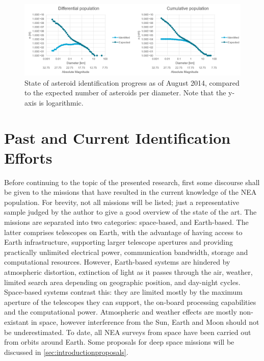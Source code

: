\begin{figure}[htbp]
 \centering
 \includegraphics[width=1.0\textwidth]{img/population_estimates.png}
 \caption{State of asteroid identification progress as of August 2014, compared to the expected number of asteroids per diameter. Note that the y-axis is logarithmic. \cite{HarrisPopulation}}
 \label{fig:population_estimates}
\end{figure}


\section{Past and Current Identification Efforts}
\label{sec:introductionidentification}

Before continuing to the topic of the presented research, first some discourse shall be given to the missions that have resulted in the current knowledge of the NEA population. For brevity, not all missions will be listed; just a representative sample judged by the author to give a good overview of the state of the art. The missions are separated into two categories: space-based, and Earth-based. The latter comprises telescopes on Earth, with the advantage of having access to Earth infrastructure, supporting larger telescope apertures and providing practically unlimited electrical power, communication bandwidth, storage and computational resources. However, Earth-based systems are hindered by atmospheric distortion, extinction of light as it passes through the air, weather, limited search area depending on geographic position, and day-night cycles. Space-based systems contrast this: they are limited mostly by the maximum aperture of the telescopes they can support, the on-board processing capabilities and the computational power. Atmospheric and weather effects are mostly non-existant in space, however interference from the Sun, Earth and Moon should not be underestimated. To date, all NEA surveys from space have been carried out from orbits around Earth. Some proposals for deep space missions will be discussed in \autoref{sec:introductionproposals}.\\


